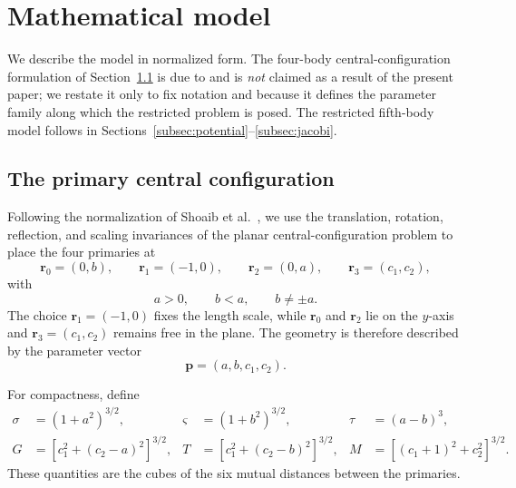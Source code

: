 \section{Mathematical model}
\label{sec:model}

We describe the model in normalized form. The four-body central-configuration
formulation of Section~\ref{subsec:cc} is due to \cite{shoaib2023}
and is \emph{not} claimed as a result of the present paper; we restate it only
to fix notation and because it defines the parameter family along which the
restricted problem is posed. The restricted fifth-body model follows in
Sections~\ref{subsec:potential}--\ref{subsec:jacobi}.

\subsection{The primary central configuration}
\label{subsec:cc}

Following the normalization of Shoaib et al.\ \cite{shoaib2023}, we use the
translation, rotation, reflection, and scaling invariances of the planar
central-configuration problem to place the four primaries at
\begin{equation}
\mathbf r_0=(0,b),\qquad
\mathbf r_1=(-1,0),\qquad
\mathbf r_2=(0,a),\qquad
\mathbf r_3=(c_1,c_2),
\label{eq:primary_positions}
\end{equation}
with
\[
a>0,\qquad b<a,\qquad b\neq \pm a.
\]
The choice $\mathbf r_1=(-1,0)$ fixes the length scale, while
$\mathbf r_0$ and $\mathbf r_2$ lie on the $y$-axis and
$\mathbf r_3=(c_1,c_2)$ remains free in the plane. The geometry is therefore
described by the parameter vector
\[
\mathbf p=(a,b,c_1,c_2).
\]

For compactness, define
\begin{equation}
\begin{aligned}
\sigma &= (1+a^2)^{3/2},
&
\varsigma &= (1+b^2)^{3/2},
&
\tau &= (a-b)^3,
\\
G &= \left[c_1^2+(c_2-a)^2\right]^{3/2},
&
T &= \left[c_1^2+(c_2-b)^2\right]^{3/2},
&
M &= \left[(c_1+1)^2+c_2^2\right]^{3/2}.
\end{aligned}
\label{eq:auxiliary_distances}
\end{equation}
These quantities are the cubes of the six mutual distances between the
primaries.

